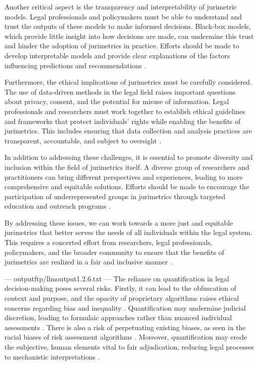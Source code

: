 Another critical aspect is the transparency and interpretability of jurimetric models. Legal professionals and policymakers must be able to understand and trust the outputs of these models to make informed decisions. Black-box models, which provide little insight into how decisions are made, can undermine this trust and hinder the adoption of jurimetrics in practice. Efforts should be made to develop interpretable models and provide clear explanations of the factors influencing predictions and recommendations \cite{rudin2019stop, doshi2017towards}.

Furthermore, the ethical implications of jurimetrics must be carefully considered. The use of data-driven methods in the legal field raises important questions about privacy, consent, and the potential for misuse of information. Legal professionals and researchers must work together to establish ethical guidelines and frameworks that protect individuals' rights while enabling the benefits of jurimetrics. This includes ensuring that data collection and analysis practices are transparent, accountable, and subject to oversight \cite{mittelstadt2016ethics, floridi2018ai}.

In addition to addressing these challenges, it is essential to promote diversity and inclusion within the field of jurimetrics itself. A diverse group of researchers and practitioners can bring different perspectives and experiences, leading to more comprehensive and equitable solutions. Efforts should be made to encourage the participation of underrepresented groups in jurimetrics through targeted education and outreach programs \cite{noble2018algorithms, benjamin2019race}.

By addressing these issues, we can work towards a more just and equitable jurimetrics that better serves the needs of all individuals within the legal system. This requires a concerted effort from researchers, legal professionals, policymakers, and the broader community to ensure that the benefits of jurimetrics are realized in a fair and inclusive manner \cite{eubanks2018automating, o2016weapons}.


---
outputftp/llmoutput1.2.6.txt
---
The reliance on quantification in legal decision-making poses several risks. Firstly, it can lead to the obfuscation of context and purpose, and the opacity of proprietary algorithms raises ethical concerns regarding bias and inequality \cite{sareen2020, saltelli2020, ribeiro2021}. Quantification may undermine judicial discretion, leading to formulaic approaches rather than nuanced individual assessments \cite{nunes2018, lynch2019}. There is also a risk of perpetuating existing biases, as seen in the racial biases of risk assessment algorithms \cite{gillborn2017}. Moreover, quantification may erode the subjective, human elements vital to fair adjudication, reducing legal processes to mechanistic interpretations \cite{ribeiro2021, souza2019}.


